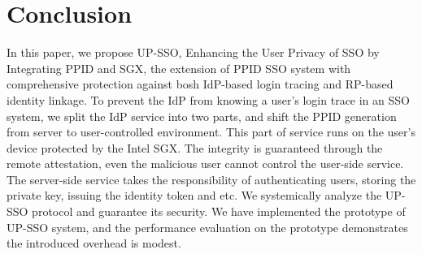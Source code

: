 \section{Conclusion}
\label{sec:conclusion}
In this paper, we propose UP-SSO, Enhancing the User Privacy of SSO by Integrating PPID and SGX, the extension of PPID SSO system with comprehensive protection against bosh IdP-based login tracing and RP-based identity linkage. To prevent the IdP from knowing a user's login trace in an SSO system, we split the IdP service into two parts, and shift the PPID generation from server to user-controlled environment.
This part of service runs on the user's device protected by the Intel SGX. The integrity is guaranteed through the remote attestation, even the malicious user cannot control the user-side service. The server-side service takes the responsibility of authenticating users, storing the private key, issuing the identity token and etc. 
We systemically analyze the UP-SSO protocol and guarantee its security. 
We have implemented the prototype of UP-SSO system, and the performance evaluation on the prototype demonstrates the introduced overhead is modest. 